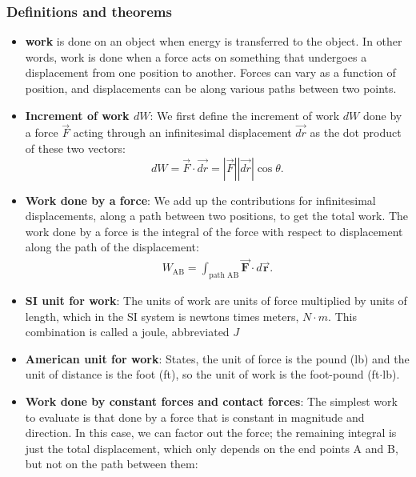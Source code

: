\documentclass{report}
\begin{document}
    \subsubsection{Definitions and theorems}
    \begin{itemize}
        \item \textbf{work} is done on an object when energy is transferred to the object. In other words, work is done when a force acts on something that undergoes a displacement from one position to another. Forces can vary as a function of position, and displacements can be along various paths between two points. 
        \item \textbf{Increment of work $dW$}: We first define the increment of work $dW$ done by a force $\vec{F}$ acting through an infinitesimal displacement $\vec{dr}$ as the dot product of these two vectors:
            \begin{equation}
                dW = \vec{F} \cdot \vec{dr} = \left|\vec{F}\right| \left|\vec{dr}\right| \cos\theta.
            \end{equation}
        \item \textbf{Work done by a force}:
            We  add up the contributions for infinitesimal displacements, along a path between two positions, to get the total work.
            \bigbreak \noindent 
            The work done by a force is the integral of the force with respect to displacement along the path of the displacement:
            \begin{align*}
                W_{\text{AB}} = \int_{\text{path AB}} \vec{\mathbf{F}} \cdot d \vec{\mathbf{r}}
            .\end{align*}
        \item \textbf{SI unit for work}: The units of work are units of force multiplied by units of length, which in the SI system is newtons times meters, $N\cdot m$. This combination is called a joule, abbreviated $J$
        \item \textbf{American unit for work}: States, the unit of force is the pound (lb) and the unit of distance is the foot (ft), so the unit of work is the foot-pound  (ft$\cdot$lb).
        \item \textbf{Work done by constant forces and contact forces}: The simplest work to evaluate is that done by a force that is constant in magnitude and direction. In this case, we can factor out the force; the remaining integral is just the total displacement, which only depends on the end points A and B, but not on the path between them:

\end{itemize}
\end{document}
